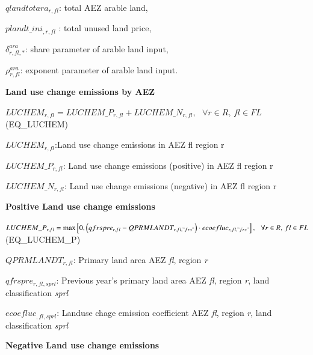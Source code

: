\documentclass[10pt,a4paper,titlepage,dvipdfmx]{book}
\begin{document}
\begin{flushleft}
$qlandtotara_{r,fl}$: total AEZ arable land,

$plandt\_ini_{, r,fl}$ : total unused land price,

$\delta _{r,fl,*}^{ara}$: share parameter of arable land input,

$\rho _{r,fl}^{ara}$: exponent parameter of arable land input.
\end{flushleft}

\begin{flushleft}\textbf{Land use change emissions by AEZ}\end{flushleft}


\begin{center}$LUCHEM_{r,fl}=LUCHEM\_ P_{r,fl}+LUCHEM\_ N_{r,fl},\,\,\,\,\forall r\in R,\,fl\in FL$ (EQ\_LUCHEM)
\end{center}

\begin{flushleft}
$LUCHEM_{r,fl}$:Land use change emissions in AEZ fl region r

$LUCHEM\_P_{r,fl}$: Land use change emissions (positive) in AEZ fl region r

$LUCHEM\_N_{r,fl}$: Land use change emissions (negative) in AEZ fl region r
\end{flushleft}

\begin{flushleft}\textbf{Positive Land use change emissions }\end{flushleft}


\begin{center}$LUCHEM\_ P_{r,fl}=\mathit{\max } \left[0,\left(qfrspre_{r,fl}-QPRMLANDT_{r,fl,"frs"}\right)\cdot ecoefluc_{r,fl,"frs"}\right],\,\,\,\,\forall r\in R,\,fl\in FL$ (EQ\_LUCHEM\_P)
\end{center}

\begin{flushleft}
$QPRMLANDT_{r,fl}$: Primary land area AEZ \textit{fl}, region \textit{r}

$qfrspre_{r,fl,sprl}$: Previous year's primary land area AEZ \textit{fl}, region \textit{r}, land classification \textit{sprl}

$ecoefluc_{,fl,sprl}$: Landuse chage emission coefficient AEZ \textit{fl}, region \textit{r}, land classification \textit{sprl}
\end{flushleft}

\begin{flushleft}\textbf{Negative Land use change emissions }\end{flushleft}
\end{document}
